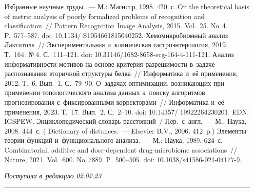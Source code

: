 \begin{multicols}{2}
{{\begin{thebibliography}{9}
 Избранные научные труды.~--- М.: Магистр, 1998. 420~с. 
 On the theoretical basis of metric analysis of poorly 
formalized problems of recognition and classification~// Pattern Recognition Image Analysis, 2015. 
Vol.~25. No.\,4. P.~577--587. doi: 10.1134/ S1054661815040252.
Хе\-мо\-мик\-ро\-би\-ом\-ный ана\-лиз Лак\-ти\-то\-ла~// Экспериментальная и~клиническая 
гаст\-ро\-эн\-те\-ро\-ло\-гия, 2019. Т.~164. №\,4. С.~111--121. doi:  
10.31146/1682-8658-ecg-164-4-111-121.
 Анализ информативности мотивов на основе 
критерия раз\-ре\-ши\-мости в~задаче рас\-по\-зна\-ва\-ния вторичной структуры белка~// 
Информатика и~её применения, 2012. Т.~6. Вып.~1. С.~79--90.
 О~задачах оптимизации, воз\-ни\-ка\-ющих при применении 
топологического анализа данных к~поиску алгоритмов прогнозирования 
с~фиксированными корректорами~// Информатика и~её применения, 2023. Т.~17. Вып.~2. 
С.~2--10.  doi: 10.14357/ 19922264230201. EDN: IGSPEW.
 Энциклопедический словарь рас\-сто\-яний~/
Пер.\ с~англ.~--- М.: Наука, 2008. 444~с.
( Dictionary of distances.~---  Elsevier B.V., 2006. 412~p.)
 Элементы тео\-рии функций и~функционального 
анализа.~--- М.: Наука, 1989. 624~с.
 Combinatorial, additive and  
dose-dependent drug-microbiome associations~// Nature, 2021. Vol.~600. No.\,7889.  
P.~500--505. doi: 10.1038/s41586-021-04177-9.

\end{thebibliography}

 }
 }

\end{multicols}

\vspace*{-8pt}

\hfill{\small\textit{Поступила в~редакцию 02.02.23}}

\vspace*{6pt}




\hrule

